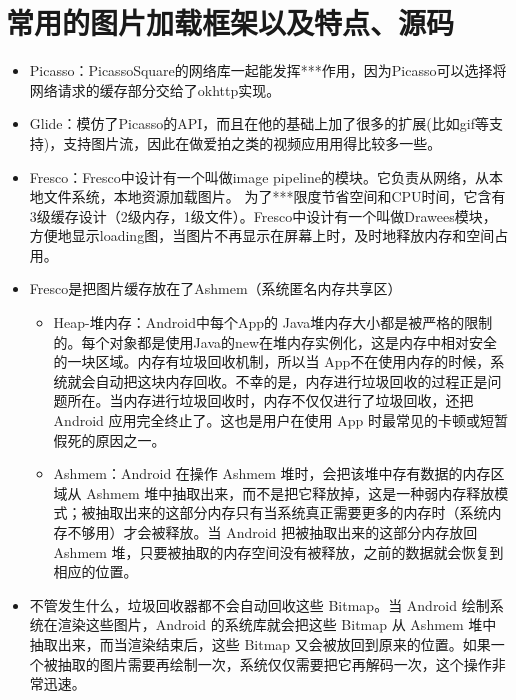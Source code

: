 \documentclass[9pt, b5paper]{article}
\begin{document}
\section{常用的图片加载框架以及特点、源码}
\label{sec-5}
\begin{itemize}
\item Picasso：PicassoSquare的网络库一起能发挥***作用，因为Picasso可以选择将网络请求的缓存部分交给了okhttp实现。
\item Glide：模仿了Picasso的API，而且在他的基础上加了很多的扩展(比如gif等支持)，支持图片流，因此在做爱拍之类的视频应用用得比较多一些。
\item Fresco：Fresco中设计有一个叫做image pipeline的模块。它负责从网络，从本地文件系统，本地资源加载图片。 为了***限度节省空间和CPU时间，它含有3级缓存设计（2级内存，1级文件）。Fresco中设计有一个叫做Drawees模块， 方便地显示loading图，当图片不再显示在屏幕上时，及时地释放内存和空间占用。
\item Fresco是把图片缓存放在了Ashmem（系统匿名内存共享区）
\begin{itemize}
\item Heap-堆内存：Android中每个App的 Java堆内存大小都是被严格的限制的。每个对象都是使用Java的new在堆内存实例化，这是内存中相对安全的一块区域。内存有垃圾回收机制，所以当 App不在使用内存的时候，系统就会自动把这块内存回收。不幸的是，内存进行垃圾回收的过程正是问题所在。当内存进行垃圾回收时，内存不仅仅进行了垃圾回收，还把 Android 应用完全终止了。这也是用户在使用 App 时最常见的卡顿或短暂假死的原因之一。
\item Ashmem：Android 在操作 Ashmem 堆时，会把该堆中存有数据的内存区域从 Ashmem 堆中抽取出来，而不是把它释放掉，这是一种弱内存释放模式；被抽取出来的这部分内存只有当系统真正需要更多的内存时（系统内存不够用）才会被释放。当 Android 把被抽取出来的这部分内存放回 Ashmem 堆，只要被抽取的内存空间没有被释放，之前的数据就会恢复到相应的位置。
\end{itemize}
\item 不管发生什么，垃圾回收器都不会自动回收这些 Bitmap。当 Android 绘制系统在渲染这些图片，Android 的系统库就会把这些 Bitmap 从 Ashmem 堆中抽取出来，而当渲染结束后，这些 Bitmap 又会被放回到原来的位置。如果一个被抽取的图片需要再绘制一次，系统仅仅需要把它再解码一次，这个操作非常迅速。
\end{itemize}
\end{document}
